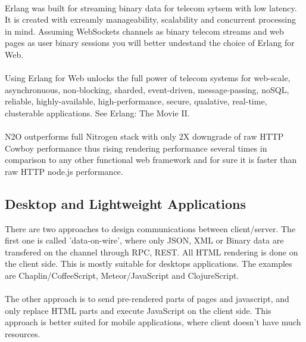 
\newpage
\paragraph{}
Erlang was built for streaming binary data for telecom sytsem with
low latency. It is created with exreamly manageability, scalability
and concurrent processing in mind. Assuming WebSockets channels as binary
telecom streams and web pages as user binary sessions
you will better undestand the choice of Erlang for Web.

\paragraph{}
Using Erlang for Web unlocks the full power of telecom systems for
web-scale, asynchronuous, non-blocking, sharded, event-driven,
message-passing, noSQL, reliable, highly-available, high-performance,
secure, qualative, real-time, clusterable applications. See Erlang: The Movie II.

\paragraph{}
N2O outperforms full Nitrogen stack with only 2X downgrade of raw
HTTP Cowboy performance thus rising rendering performance several
times in comparison to any other functional web framework and for
sure it is faster than raw HTTP node.js performance.

\subsection*{Desktop and Lightweight Applications}
There are two approaches to design communications between client/server.
The first one is called 'data-on-wire', where only JSON, XML or Binary
data are transfered on the channel through RPC, REST. All HTML rendering
is done on the client side. This is mostly suitable for desktops
applications. The examples are Chaplin/CoffeeScript, Meteor/JavaScript
and ClojureScript.
\paragraph{}
The other approach is to send pre-rendered parts of pages and javascript,
and only replace HTML parts and execute JavaScript on the client side. This approach
is better suited for mobile applications, where client doesn't have much resources.
